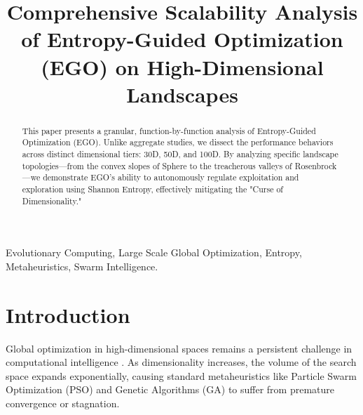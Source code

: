 \documentclass[conference]{IEEEtran}
\begin{document}
\title{Comprehensive Scalability Analysis of Entropy-Guided Optimization (EGO) on High-Dimensional Landscapes}

\author{
}

\maketitle

\begin{abstract}
This paper presents a granular, function-by-function analysis of Entropy-Guided Optimization (EGO). Unlike aggregate studies, we dissect the performance behaviors across distinct dimensional tiers: 30D, 50D, and 100D. By analyzing specific landscape topologies—from the convex slopes of Sphere to the treacherous valleys of Rosenbrock—we demonstrate EGO's ability to autonomously regulate exploitation and exploration using Shannon Entropy, effectively mitigating the "Curse of Dimensionality."
\end{abstract}

\begin{IEEEkeywords}
Evolutionary Computing, Large Scale Global Optimization, Entropy, Metaheuristics, Swarm Intelligence.
\end{IEEEkeywords}

\section{Introduction}
Global optimization in high-dimensional spaces remains a persistent challenge in computational intelligence \cite{b1}. As dimensionality increases, the volume of the search space expands exponentially, causing standard metaheuristics like Particle Swarm Optimization (PSO) \cite{b2} and Genetic Algorithms (GA) \cite{b3} to suffer from premature convergence or stagnation.
\end{document}
